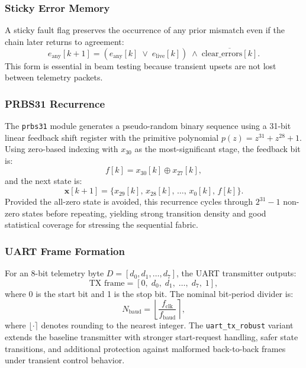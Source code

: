 \subsubsection{Sticky Error Memory}

A sticky fault flag preserves the occurrence of any prior mismatch even
if the chain later returns to agreement:
\begin{equation}
    e_\text{any}[k+1] =
        \left(e_\text{any}[k] \;\vee\; e_\text{live}[k]\right)
        \;\wedge\; \overline{\text{clear\_errors}[k]}.
    \label{eq:eany}
\end{equation}
This form is essential in beam testing because transient upsets are not
lost between telemetry packets.

\subsubsection{PRBS31 Recurrence}

The \texttt{prbs31} module generates a pseudo-random binary sequence
using a 31-bit linear feedback shift register with the primitive
polynomial $p(z) = z^{31} + z^{28} + 1$.  Using zero-based indexing
with $x_{30}$ as the most-significant stage, the feedback bit is:
\begin{equation}
    f[k] = x_{30}[k] \oplus x_{27}[k],
    \label{eq:prbs_feedback}
\end{equation}
and the next state is:
\begin{equation}
    \mathbf{x}[k+1] = \{x_{29}[k],\, x_{28}[k],\, \ldots,\,
                          x_0[k],\, f[k]\}.
    \label{eq:prbs_update}
\end{equation}
Provided the all-zero state is avoided, this recurrence cycles through
$2^{31} - 1$ non-zero states before repeating, yielding strong
transition density and good statistical coverage for stressing the
sequential fabric.

\subsubsection{UART Frame Formation}

For an 8-bit telemetry byte $D = [d_0, d_1, \ldots, d_7]$, the UART
transmitter outputs:
\begin{equation}
    \text{TX frame} = [0,\; d_0,\; d_1,\; \ldots,\; d_7,\; 1],
    \label{eq:uart_frame}
\end{equation}
where 0 is the start bit and 1 is the stop bit.  The nominal bit-period
divider is:
\begin{equation}
    N_\text{baud} = \left\lfloor\frac{f_\text{clk}}{f_\text{baud}}
                    \right\rceil,
    \label{eq:baud}
\end{equation}
where $\lfloor\cdot\rceil$ denotes rounding to the nearest integer.  The
\texttt{uart\_tx\_robust} variant extends the baseline transmitter with
stronger start-request handling, safer state transitions, and additional
protection against malformed back-to-back frames under transient control
behavior.


